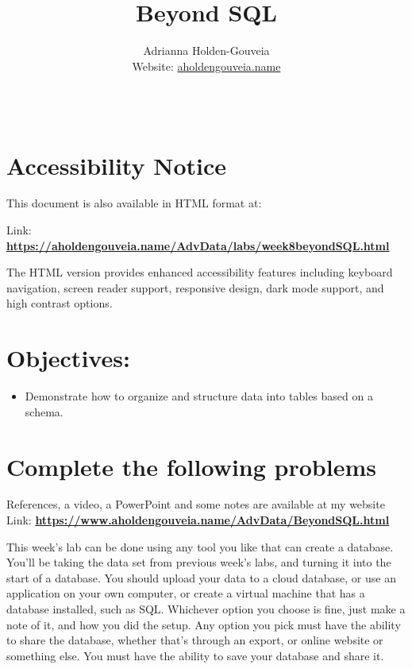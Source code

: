 \documentclass[12pt]{article}
\title{Beyond SQL}
\author{
        Adrianna Holden-Gouveia \\
        Website: \href{https://aholdengouveia.name}{aholdengouveia.name}\\ 
        \date{\vspace{-5ex}}
        \faGithub {: aholdengouveia} \\
        }
\begin{document}
    

\maketitle



\section*{Accessibility Notice}
This document is also available in HTML format at:

Link: \href{https://aholdengouveia.name/AdvData/labs/week8beyondSQL.html}{\textbf{https://aholdengouveia.name/AdvData/labs/week8beyondSQL.html}}

The HTML version provides enhanced accessibility features including keyboard navigation, screen reader support, responsive design, dark mode support, and high contrast options.

\section*{Objectives:}
\begin{itemize}
    \item Demonstrate how to organize and structure data into tables based on a schema.
\end{itemize}
\section*{Complete the following problems}

References, a video, a PowerPoint and some notes are available at my website
Link: \href{https://www.aholdengouveia.name/AdvData/BeyondSQL.html}{\textbf{https://www.aholdengouveia.name/AdvData/BeyondSQL.html}}

This week's lab can be done using any tool you like that can create a database.  You'll be taking the data set from previous week's labs, and turning it into the start of a database.  You should upload your data to a cloud database, or use an application on your own computer, or create a virtual machine that has a database installed, such as SQL.  Whichever option you choose is fine, just make a note of it, and how you did the setup.  Any option you pick must have the ability to share the database, whether that's through an export, or online website or something else.  You must have the ability to save your database and share it. 
\end{document}
